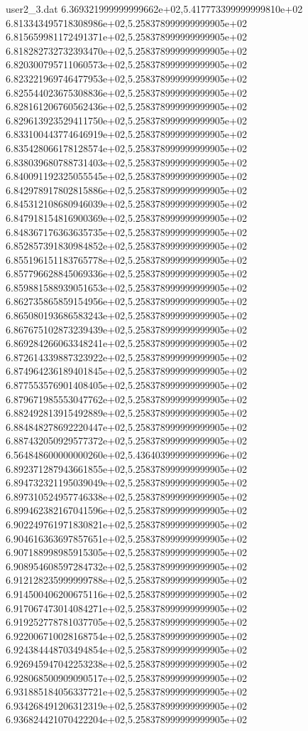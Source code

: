 \begin{filecontents}{user2_3.dat}
6.369321999999999662e+02,5.417773399999999810e+02
6.813343495718308986e+02,5.258378999999999905e+02
6.815659981172491371e+02,5.258378999999999905e+02
6.818282732732393470e+02,5.258378999999999905e+02
6.820300795711060573e+02,5.258378999999999905e+02
6.823221969746477953e+02,5.258378999999999905e+02
6.825544023675308836e+02,5.258378999999999905e+02
6.828161206760562436e+02,5.258378999999999905e+02
6.829613923529411750e+02,5.258378999999999905e+02
6.833100443774646919e+02,5.258378999999999905e+02
6.835428066178128574e+02,5.258378999999999905e+02
6.838039680788731403e+02,5.258378999999999905e+02
6.840091192325055545e+02,5.258378999999999905e+02
6.842978917802815886e+02,5.258378999999999905e+02
6.845312108680946039e+02,5.258378999999999905e+02
6.847918154816900369e+02,5.258378999999999905e+02
6.848367176363635735e+02,5.258378999999999905e+02
6.852857391830984852e+02,5.258378999999999905e+02
6.855196151183765778e+02,5.258378999999999905e+02
6.857796628845069336e+02,5.258378999999999905e+02
6.859881588939051653e+02,5.258378999999999905e+02
6.862735865859154956e+02,5.258378999999999905e+02
6.865080193686583243e+02,5.258378999999999905e+02
6.867675102873239439e+02,5.258378999999999905e+02
6.869284266063348241e+02,5.258378999999999905e+02
6.872614339887323922e+02,5.258378999999999905e+02
6.874964236189401845e+02,5.258378999999999905e+02
6.877553576901408405e+02,5.258378999999999905e+02
6.879671985553047762e+02,5.258378999999999905e+02
6.882492813915492889e+02,5.258378999999999905e+02
6.884848278692220447e+02,5.258378999999999905e+02
6.887432050929577372e+02,5.258378999999999905e+02
6.564848600000000260e+02,5.436403999999999996e+02
6.892371287943661855e+02,5.258378999999999905e+02
6.894732321195039049e+02,5.258378999999999905e+02
6.897310524957746338e+02,5.258378999999999905e+02
6.899462382167041596e+02,5.258378999999999905e+02
6.902249761971830821e+02,5.258378999999999905e+02
6.904616363697857651e+02,5.258378999999999905e+02
6.907188998985915305e+02,5.258378999999999905e+02
6.908954608597284732e+02,5.258378999999999905e+02
6.912128235999999788e+02,5.258378999999999905e+02
6.914500406200675116e+02,5.258378999999999905e+02
6.917067473014084271e+02,5.258378999999999905e+02
6.919252778781037705e+02,5.258378999999999905e+02
6.922006710028168754e+02,5.258378999999999905e+02
6.924384448703494854e+02,5.258378999999999905e+02
6.926945947042253238e+02,5.258378999999999905e+02
6.928068500909090517e+02,5.258378999999999905e+02
6.931885184056337721e+02,5.258378999999999905e+02
6.934268491206312319e+02,5.258378999999999905e+02
6.936824421070422204e+02,5.258378999999999905e+02

\end{filecontents}
